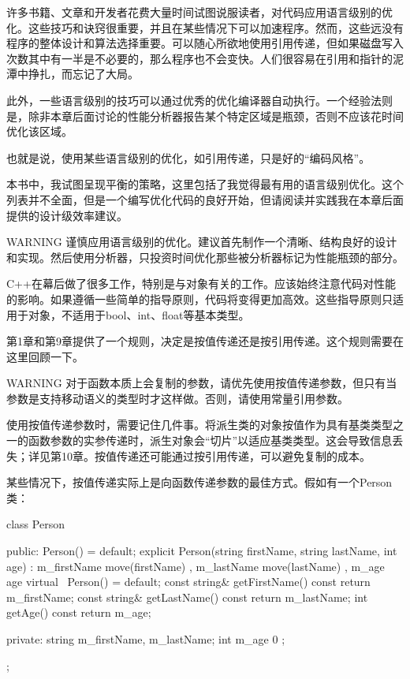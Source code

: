 
许多书籍、文章和开发者花费大量时间试图说服读者，对代码应用语言级别的优化。这些技巧和诀窍很重要，并且在某些情况下可以加速程序。然而，这些远没有程序的整体设计和算法选择重要。可以随心所欲地使用引用传递，但如果磁盘写入次数其中有一半是不必要的，那么程序也不会变快。人们很容易在引用和指针的泥潭中挣扎，而忘记了大局。

此外，一些语言级别的技巧可以通过优秀的优化编译器自动执行。一个经验法则是，除非本章后面讨论的性能分析器报告某个特定区域是瓶颈，否则不应该花时间优化该区域。

也就是说，使用某些语言级别的优化，如引用传递，只是好的“编码风格”。

本书中，我试图呈现平衡的策略，这里包括了我觉得最有用的语言级别优化。这个列表并不全面，但是一个编写优化代码的良好开始，但请阅读并实践我在本章后面提供的设计级效率建议。

\begin{myWarning}{WARNING}
谨慎应用语言级别的优化。建议首先制作一个清晰、结构良好的设计和实现。然后使用分析器，只投资时间优化那些被分析器标记为性能瓶颈的部分。
\end{myWarning}


C++在幕后做了很多工作，特别是与对象有关的工作。应该始终注意代码对性能的影响。如果遵循一些简单的指导原则，代码将变得更加高效。这些指导原则只适用于对象，不适用于bool、int、float等基本类型。


第1章和第9章提供了一个规则，决定是按值传递还是按引用传递。这个规则需要在这里回顾一下。

\begin{myWarning}{WARNING}
对于函数本质上会复制的参数，请优先使用按值传递参数，但只有当参数是支持移动语义的类型时才这样做。否则，请使用常量引用参数。
\end{myWarning}

使用按值传递参数时，需要记住几件事。将派生类的对象按值作为具有基类类型之一的函数参数的实参传递时，派生对象会“切片”以适应基类类型。这会导致信息丢失；详见第10章。按值传递还可能通过按引用传递，可以避免复制的成本。

某些情况下，按值传递实际上是向函数传递参数的最佳方式。假如有一个Person类：

\begin{cpp}
class Person
{
    public:
        Person() = default;
        explicit Person(string firstName, string lastName, int age)
            : m_firstName { move(firstName) }, m_lastName { move(lastName) }
            , m_age { age } { }
        virtual ~Person() = default;
        const string& getFirstName() const { return m_firstName; }
        const string& getLastName() const { return m_lastName; }
        int getAge() const { return m_age; }

    private:
        string m_firstName, m_lastName;
        int m_age { 0 };
};
\end{cpp}

